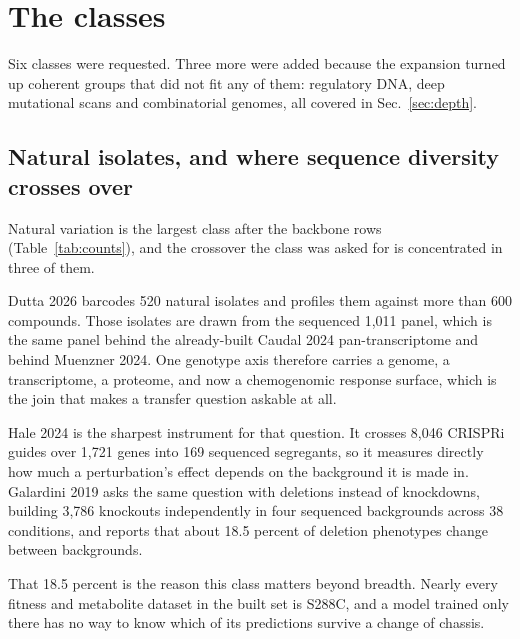 
\section{The classes}\label{sec:classes}

Six classes were requested. Three more were added because the expansion turned up
coherent groups that did not fit any of them: regulatory DNA, deep mutational scans and
combinatorial genomes, all covered in Sec.~\ref{sec:depth}.

\subsection{Natural isolates, and where sequence diversity crosses over}

Natural variation is the largest class after the backbone rows (Table~\ref{tab:counts}), and the
crossover the class was asked for is concentrated in three of them.

Dutta 2026 barcodes 520 natural isolates and profiles them against more than 600
compounds. Those isolates are drawn from the sequenced 1,011 panel, which is the same panel
behind the already-built Caudal 2024 pan-transcriptome and behind Muenzner 2024.
One genotype axis therefore carries a genome, a transcriptome, a proteome, and now a
chemogenomic response surface, which is the join that makes a transfer question askable at
all.

Hale 2024 is the sharpest instrument for that question. It crosses 8,046 CRISPRi
guides over 1,721 genes into 169 sequenced segregants, so it measures directly how much a
perturbation's effect depends on the background it is made in. Galardini 2019
asks the same question with deletions instead of knockdowns, building 3,786 knockouts
independently in four sequenced backgrounds across 38 conditions, and reports that about
18.5 percent of deletion phenotypes change between backgrounds.

That 18.5 percent is the reason this class matters beyond breadth. Nearly every fitness and
metabolite dataset in the built set is S288C, and a model trained only there has no way to
know which of its predictions survive a change of chassis.

